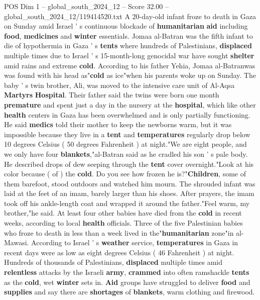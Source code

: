 \begin{textsample}{POS Dim 1 – global\_south\_2024\_12 – Score 32.00 – global\_south\_2024\_12/119414520.txt}  \label{ex:f1_pos_106}
A 20-day-old infant froze to death in Gaza on Sunday amid Israel ' s continuous blockade of \textbf{humanitarian} \textbf{aid} including \textbf{food}, \textbf{medicines} and \textbf{winter} essentials.
Jomaa al-Batran was the fifth infant to die of hypothermia in Gaza ' s \textbf{tents} where hundreds of Palestinians, \textbf{displaced} multiple times due to Israel ' s 15-month-long genocidal war have sought \textbf{shelter} amid rains and extreme \textbf{cold}.
According to his father Yehia, Jomaa al-Batranwas was found with his head as"\textbf{cold} as ice"when his parents woke up on Sunday.
The baby ' s twin brother, Ali, was moved to the intensive care unit of Al-Aqsa \textbf{Martyrs} \textbf{Hospital}.
Their father said the twins were born one month \textbf{premature} and spent just a day in the nursery at the \textbf{hospital}, which like other \textbf{health} centers in Gaza has been overwhelmed and is only partially functioning.
He said \textbf{medics} told their mother to keep the newborns warm, but it was impossible because they live in a \textbf{tent} and \textbf{temperatures} regularly drop below 10 degrees Celsius ( 50 degrees Fahrenheit ) at night."We are eight people, and we only have four \textbf{blankets},"al-Batran said as he cradled his son ' s pale body.
He described drops of dew seeping through the \textbf{tent} cover overnight."Look at his color because ( of ) the \textbf{cold}.
Do you see how frozen he is?"\textbf{Children}, some of them barefoot, stood outdoors and watched him mourn.
The shrouded infant was laid at the feet of an imam, barely larger than his shoes.
After prayers, the imam took off his ankle-length coat and wrapped it around the father."Feel warm, my brother,"he said.
At least four other babies have died from the \textbf{cold} in recent weeks, according to local \textbf{health} officials.
Three of the five Palestinian babies who froze to death in less than a week lived in the"\textbf{humanitarian} zone"in al-Mawasi.
According to Israel ' s \textbf{weather} service, \textbf{temperatures} in Gaza in recent days were as low as eight degrees Celsius ( 46 Fahrenheit ) at night.
Hundreds of thousands of Palestinians, \textbf{displaced} multiple times amid \textbf{relentless} attacks by the Israeli \textbf{army}, \textbf{crammed} into often ramshackle \textbf{tents} as the \textbf{cold}, wet \textbf{winter} sets in. \textbf{Aid} groups have struggled to deliver \textbf{food} and \textbf{supplies} and say there are \textbf{shortages} of \textbf{blankets}, warm clothing and firewood.

\end{textsample}
